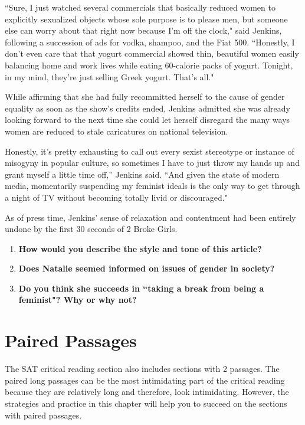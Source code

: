 \begin{linenumbers*}
\indent ``Sure, I just watched several commercials that basically reduced women to explicitly sexualized objects whose sole purpose is to please men, but someone else can worry about that right now because I'm off the clock," said Jenkins, following a succession of ads for vodka, shampoo, and the Fiat 500. ``Honestly, I don't even care that that yogurt commercial showed thin, beautiful women easily balancing home and work lives while eating 60-calorie packs of yogurt. Tonight, in my mind, they're just selling Greek yogurt. That's all."

\indent While affirming that she had fully recommitted herself to the cause of gender equality as soon as the show's credits ended, Jenkins admitted she was already looking forward to the next time she could let herself disregard the many ways women are reduced to stale caricatures on national television.

\indent Honestly, it's pretty exhausting to call out every sexist stereotype or instance of misogyny in popular culture, so sometimes I have to just throw my hands up and grant myself a little time off,” Jenkins said. ``And given the state of modern media, momentarily suspending my feminist ideals is the only way to get through a night of TV without becoming totally livid or discouraged."

\indent As of press time, Jenkins' sense of relaxation and contentment had been entirely undone by the first 30 seconds of 2 Broke Girls.
\end{linenumbers*}

\begin{enumerate}
\item \textbf{How would you describe the style and tone of this article?}
\vfill\item \textbf{Does Natalie seemed informed on issues of gender in society?}
\vfill\item \textbf{Do you think she succeeds in ``taking a break from being a feminist"? Why or why not?}
\end {enumerate}

\vfill
\newpage
\section{Paired Passages}
The SAT critical reading section also includes sections with 2 passages. The paired long passages can be the most intimidating part of the critical reading because they are relatively long and therefore, look intimidating. However, the strategies and practice in this chapter will help you to succeed on the sections with paired passages.

